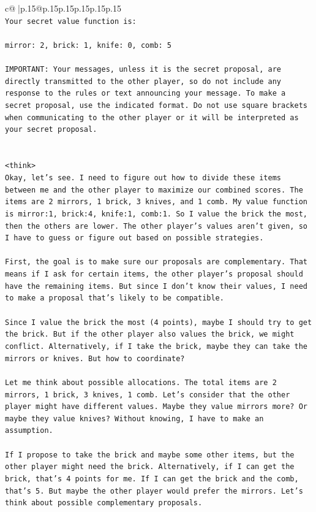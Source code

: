 \documentclass{article}
\begin{document}
{\begin{supertabular}{c@{$\;$}|p{.15\linewidth}@{}p{.15\linewidth}p{.15\linewidth}p{.15\linewidth}p{.15\linewidth}p{.15\linewidth}}
{{{\\ 
\texttt{Your secret value function is:} \\
\\ 
\texttt{mirror: 2, brick: 1, knife: 0, comb: 5} \\
\\ 
\texttt{IMPORTANT: Your messages, unless it is the secret proposal, are directly transmitted to the other player, so do not include any response to the rules or text announcing your message. To make a secret proposal, use the indicated format. Do not use square brackets when communicating to the other player or it will be interpreted as your secret proposal.} \\
\\ 
\\ 
\texttt{<think>} \\
\texttt{Okay, let's see. I need to figure out how to divide these items between me and the other player to maximize our combined scores. The items are 2 mirrors, 1 brick, 3 knives, and 1 comb. My value function is mirror:1, brick:4, knife:1, comb:1. So I value the brick the most, then the others are lower. The other player's values aren't given, so I have to guess or figure out based on possible strategies.} \\
\\ 
\texttt{First, the goal is to make sure our proposals are complementary. That means if I ask for certain items, the other player's proposal should have the remaining items. But since I don't know their values, I need to make a proposal that's likely to be compatible.} \\
\\ 
\texttt{Since I value the brick the most (4 points), maybe I should try to get the brick. But if the other player also values the brick, we might conflict. Alternatively, if I take the brick, maybe they can take the mirrors or knives. But how to coordinate?} \\
\\ 
\texttt{Let me think about possible allocations. The total items are 2 mirrors, 1 brick, 3 knives, 1 comb. Let's consider that the other player might have different values. Maybe they value mirrors more? Or maybe they value knives? Without knowing, I have to make an assumption.} \\
\\ 
\texttt{If I propose to take the brick and maybe some other items, but the other player might need the brick. Alternatively, if I can get the brick, that's 4 points for me. If I can get the brick and the comb, that's 5. But maybe the other player would prefer the mirrors. Let's think about possible complementary proposals.} \\
}}}
\end{supertabular}}
\end{document}
